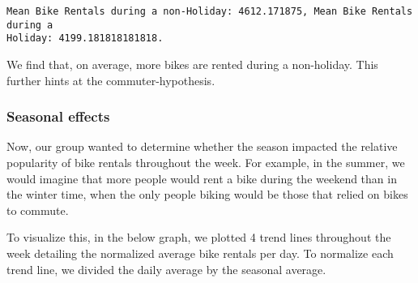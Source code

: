 \documentclass[11pt]{article}
\begin{document}
    \begin{Verbatim}[commandchars=\\\{\},fontsize=\footnotesize]
Mean Bike Rentals during a non-Holiday: 4612.171875, Mean Bike Rentals during a
Holiday: 4199.181818181818.

    \end{Verbatim}

    We find that, on average, more bikes are rented during a non-holiday.
This further hints at the commuter-hypothesis.

    \subsubsection{Seasonal effects}\label{seasonal-effects}

Now, our group wanted to determine whether the season impacted the
relative popularity of bike rentals throughout the week. For example, in
the summer, we would imagine that more people would rent a bike during
the weekend than in the winter time, when the only people biking would
be those that relied on bikes to commute.

To visualize this, in the below graph, we plotted 4 trend lines
throughout the week detailing the normalized average bike rentals per
day. To normalize each trend line, we divided the daily average by the
seasonal average.
\end{document}
